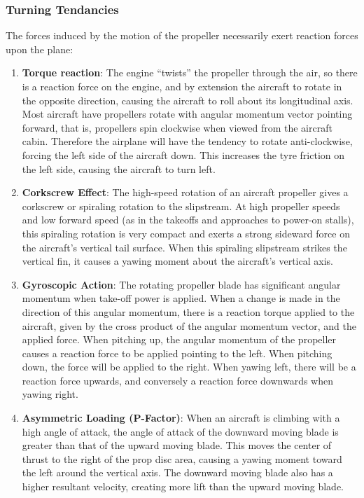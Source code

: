 \documentclass[12pt]{article}
\begin{document}
		\subsubsection{Turning Tendancies}
			 The forces induced by the motion of the propeller necessarily exert reaction forces upon the plane:
			 	\begin{enumerate}
			 		\item \textbf{Torque reaction}: The engine ``twists'' the propeller through the air, so there is a reaction force on the engine, and by extension the aircraft to rotate in the opposite direction, causing the aircraft to roll about its longitudinal axis. Most aircraft have propellers rotate with angular momentum vector pointing forward, that is, propellers spin clockwise when viewed from the aircraft cabin. Therefore the airplane will have the tendency to rotate anti-clockwise, forcing the left side of the aircraft down. This increases the tyre friction on the left side, causing the aircraft to turn left.
			 		\item \textbf{Corkscrew Effect}: The high-speed rotation of an aircraft propeller gives a corkscrew or spiraling rotation to the slipstream. At high propeller speeds and low forward speed (as in the takeoffs and approaches to power-on stalls), this spiraling rotation is very compact and exerts a strong sideward force on the aircraft’s vertical tail surface. When this spiraling slipstream strikes the vertical fin, it causes a yawing moment about the aircraft’s vertical axis.
			 		\item \textbf{Gyroscopic Action}: The rotating propeller blade has significant angular momentum when take-off power is applied. When a change is made in the direction of this angular momentum, there is a reaction torque applied to the aircraft, given by the cross product of the angular momentum vector, and the applied force. When pitching up, the angular momentum of the propeller causes a reaction force to be applied pointing to the left. When pitching down, the force will be applied to the right. When yawing left, there will be a reaction force upwards, and conversely a reaction force downwards when yawing right.
			 		\item \textbf{Asymmetric Loading (P-Factor)}: When an aircraft is climbing with a high angle of attack, the angle of attack of the downward moving blade is greater than that of the upward moving blade. This moves the center of thrust to the right of the prop disc area, causing a yawing moment toward the left around the vertical axis. The downward moving blade also has a higher resultant velocity, creating more lift than the upward moving blade.
			 	\end{enumerate}
\end{document}
